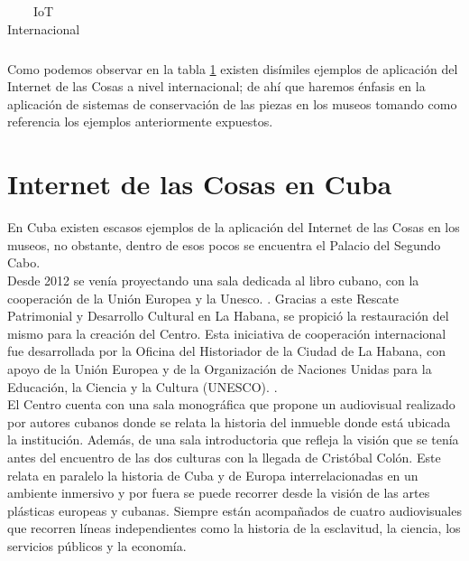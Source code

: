\begin{table}[h]
\begin{tabular}{|lll|}
                \end{tabular}
            \caption{IoT Internacional}
            \label{tab: iotInternacional}
        \end{table}
                
        Como podemos observar en la tabla \ref{tab: iotInternacional} existen disímiles ejemplos de aplicación del Internet de las Cosas a nivel internacional; de ahí que haremos énfasis en la aplicación de sistemas de conservación de las piezas en los museos tomando como referencia los ejemplos anteriormente expuestos.

    \section{Internet de las Cosas en Cuba}\label{sec:iotCuba} 
        En Cuba existen escasos ejemplos de la aplicación del Internet de las Cosas en los museos, no obstante, dentro de esos pocos se encuentra el Palacio del Segundo Cabo.\\
        
        Desde 2012 se venía proyectando una sala dedicada al libro cubano, con la cooperación de la Unión Europea y la Unesco. \cite{oficinaHistoriadorRescatepatrimonio}. Gracias a este Rescate Patrimonial y Desarrollo Cultural en La Habana, se propició la restauración del mismo para la creación del Centro. Esta iniciativa de cooperación internacional fue desarrollada por la Oficina del Historiador de la Ciudad de La Habana, con apoyo de la Unión Europea y de la Organización de Naciones Unidas para la Educación, la Ciencia y la Cultura (UNESCO). \cite{potencialidadProyectoMuseologico}.\\
        
        El Centro cuenta con una sala monográfica que propone un audiovisual realizado por autores cubanos donde se relata la historia del inmueble donde está ubicada la institución. Además, de una sala introductoria que refleja la visión que se tenía antes del encuentro de las dos culturas con la llegada de Cristóbal Colón. Este relata en paralelo la historia de Cuba y de Europa interrelacionadas en un ambiente inmersivo y por fuera se puede recorrer desde la visión de las artes plásticas europeas y cubanas. Siempre están acompañados de cuatro audiovisuales que recorren líneas independientes como la historia de la esclavitud, la ciencia, los servicios públicos y la economía.\\
        
